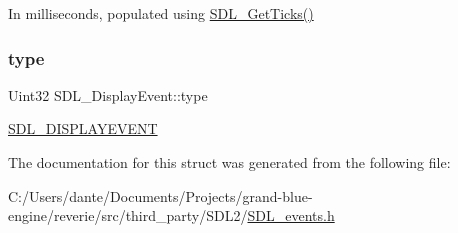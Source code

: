 In milliseconds, populated using \mbox{\hyperlink{_s_d_l__timer_8h_a0b9bc71d6287e0ffafdc3419760fe2b3}{S\+D\+L\+\_\+\+Get\+Ticks()}} \mbox{\label{struct_s_d_l___display_event_a5f4993ce9c5289a2ac046ae7a6dff544}} 
\subsubsection{\texorpdfstring{type}{type}}
{\footnotesize\ttfamily Uint32 S\+D\+L\+\_\+\+Display\+Event\+::type}

\mbox{\hyperlink{_s_d_l__events_8h_a3b589e89be6b35c02e0dd34a55f3fccaa825818ce6265316146d7288601fd5974}{S\+D\+L\+\_\+\+D\+I\+S\+P\+L\+A\+Y\+E\+V\+E\+NT}} 

The documentation for this struct was generated from the following file\+:\begin{DoxyCompactItemize}
\item 
C\+:/\+Users/dante/\+Documents/\+Projects/grand-\/blue-\/engine/reverie/src/third\+\_\+party/\+S\+D\+L2/\mbox{\hyperlink{_s_d_l__events_8h}{S\+D\+L\+\_\+events.\+h}}\end{DoxyCompactItemize}
